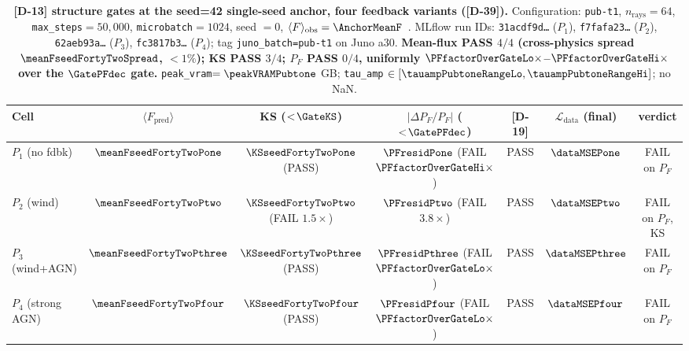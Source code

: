 \begin{table}[t]
    \centering
    \renewcommand{\arraystretch}{1.15}
    \setlength{\tabcolsep}{3pt}
    \footnotesize
    \begin{tabular}{l|cccccc}
    Cell & $\langle F_{\text{pred}}\rangle$ & KS ($<\!\GateKS$) & $|\Delta P_F/P_F|$ ($<\!\GatePFdec$) & [D-19] & $\mathcal{L}_{\text{data}}$ (final) & verdict \\
    \hline
    $P_1$ (no fdbk)    & $\meanFseedFortyTwoPone$ & $\KSseedFortyTwoPone$ (PASS) & $\mathbf{\PFresidPone}$ (FAIL $\mathbf{\PFfactorOverGateHi\times}$) & PASS & $\dataMSEPone$ & FAIL on $P_F$ \\
    $P_2$ (wind)       & $\meanFseedFortyTwoPtwo$ & $\mathbf{\KSseedFortyTwoPtwo}$ (FAIL $1.5\times$) & $\mathbf{\PFresidPtwo}$ (FAIL $3.8\times$) & PASS & $\dataMSEPtwo$ & FAIL on $P_F$, KS \\
    $P_3$ (wind+AGN)   & $\meanFseedFortyTwoPthree$ & $\KSseedFortyTwoPthree$ (PASS) & $\mathbf{\PFresidPthree}$ (FAIL $\mathbf{\PFfactorOverGateLo\times}$) & PASS & $\dataMSEPthree$ & FAIL on $P_F$ \\
    $P_4$ (strong AGN) & $\meanFseedFortyTwoPfour$ & $\KSseedFortyTwoPfour$ (PASS) & $\mathbf{\PFresidPfour}$ (FAIL $\mathbf{\PFfactorOverGateLo\times}$) & PASS & $\dataMSEPfour$ & FAIL on $P_F$ \\
    \end{tabular}
    \caption{\textbf{[D-13] structure gates at the seed=42 single-seed anchor, four feedback variants ([D-39]).} Configuration: \texttt{pub-t1}, $n_{\text{rays}}=64$, \texttt{max\_steps}$=50{,}000$, \texttt{microbatch}$=1024$, seed $=0$, $\langle F\rangle_{\text{obs}}=\AnchorMeanF$~\cite{kirkman2007}. MLflow run IDs: \texttt{31acdf9d\dots} ($P_1$), \texttt{f7fafa23\dots} ($P_2$), \texttt{62aeb93a\dots} ($P_3$), \texttt{fc3817b3\dots} ($P_4$); tag \texttt{juno\_batch=pub-t1} on Juno a30. \textbf{Mean-flux PASS $4/4$ (cross-physics spread $\meanFseedFortyTwoSpread$, $<\!1\%$); KS PASS $3/4$; $P_F$ PASS $0/4$, uniformly $\PFfactorOverGateLo\times$--$\PFfactorOverGateHi\times$ over the $\GatePFdec$ gate.} \texttt{peak\_vram}$=\peakVRAMPubtone$ GB; \texttt{tau\_amp} $\in[\tauampPubtoneRangeLo, \tauampPubtoneRangeHi]$; no NaN.}
    \label{tab:pub-t1-gates}
\end{table}

